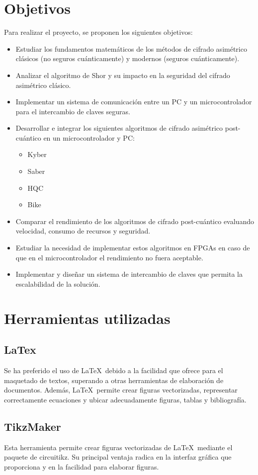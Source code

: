 \section{Objetivos}
Para realizar el proyecto, se proponen los siguientes objetivos:
\begin{itemize}
\item Estudiar los fundamentos matemáticos de los métodos de cifrado asimétrico clásicos (no seguros cuánticamente) y modernos (seguros cuánticamente).
\item Analizar el algoritmo de Shor y su impacto en la seguridad del cifrado asimétrico clásico.
\item Implementar un sistema de comunicación entre un PC y un microcontrolador para el intercambio de claves seguras.
\item  Desarrollar e integrar los siguientes algoritmos de cifrado asimétrico post-cuántico en un microcontrolador y PC:
\begin{itemize}
	\item Kyber
	\item Saber
	\item HQC
	\item Bike
\end{itemize}
\item Comparar el rendimiento de los algoritmos de cifrado post-cuántico evaluando velocidad, consumo de recursos y seguridad.
\item Estudiar la necesidad de implementar estos algoritmos en FPGAs en caso de que en el microcontrolador el rendimiento no fuera aceptable.
\item Implementar y diseñar un sistema de intercambio de claves que permita la escalabilidad de la solución.
\end{itemize}


\section{Herramientas utilizadas}
\subsection{LaTex \cite{latex}} 
Se ha preferido el uso de \LaTeX\ debido a la facilidad que ofrece para el maquetado de textos, superando a otras herramientas de elaboración de documentos. Además, \LaTeX\ permite crear figuras vectorizadas, representar correctamente ecuaciones y ubicar adecuadamente figuras, tablas y bibliografía.
\subsection{TikzMaker \cite{tikzmaker}} 
Esta herramienta permite crear figuras vectorizadas de \LaTeX\ mediante el paquete de circuitikz. Su principal ventaja radica en la interfaz gráfica que proporciona y en la facilidad para elaborar figuras.

